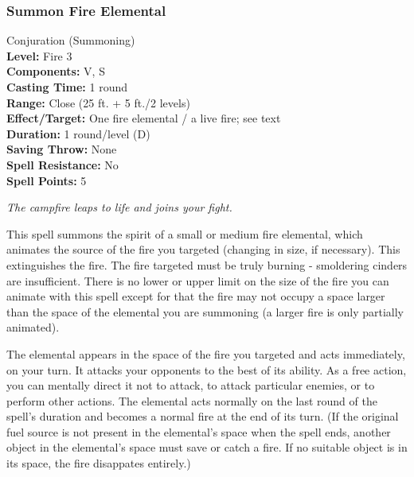 \subsubsection{Summon Fire Elemental}
\label{Spell:SummonFireElemental}
Conjuration (Summoning)
\\ \textbf{Level:} Fire 3
\\ \textbf{Components:} V, S
\\ \textbf{Casting Time:} 1 round
\\ \textbf{Range:} Close (25 ft. + 5 ft./2 levels)
\\ \textbf{Effect/Target:} One fire elemental / a live fire; see text
\\ \textbf{Duration:} 1 round/level (D)
\\ \textbf{Saving Throw:} None
\\ \textbf{Spell Resistance:} No
\\ \textbf{Spell Points:} 5

\emph{The campfire leaps to life and joins your fight.}

This spell summons the spirit of a small or medium fire elemental, which animates the source of the fire you targeted (changing in size, if necessary).
This extinguishes the fire.
The fire targeted must be truly burning - smoldering cinders are insufficient.
There is no lower or upper limit on the size of the fire you can animate with this spell except 
for that the fire may not occupy a space larger than the space of the elemental you are summoning (a larger fire is only partially animated).

The elemental appears in the space of the fire you targeted and acts immediately, on your turn.
It attacks your opponents to the best of its ability. 
As a free action, you can mentally direct it not to attack, to attack particular enemies, or to perform other actions. 
The elemental acts normally on the last round of the spell's duration and becomes a normal fire at the end of its turn.
(If the original fuel source is not present in the elemental's space when the spell ends, 
another object in the elemental's space must save or catch a fire.
If no suitable object is in its space, the fire disappates entirely.)

